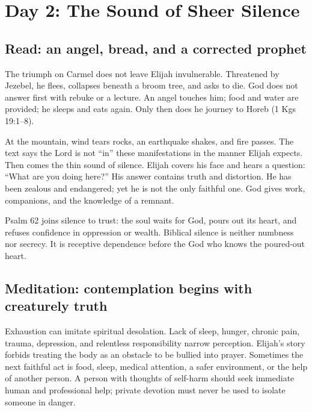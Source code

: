 \section{Day 2: The Sound of Sheer Silence}


\subsection{Read: an angel, bread, and a corrected prophet}

The triumph on Carmel does not leave Elijah invulnerable. Threatened by Jezebel, he flees, collapses beneath a broom tree, and asks to die. God does not answer first with rebuke or a lecture. An angel touches him; food and water are provided; he sleeps and eats again. Only then does he journey to Horeb (1 Kgs 19:1--8).

At the mountain, wind tears rocks, an earthquake shakes, and fire passes. The text says the Lord is not ``in'' these manifestations in the manner Elijah expects. Then comes the thin sound of silence. Elijah covers his face and hears a question: ``What are you doing here?'' His answer contains truth and distortion. He has been zealous and endangered; yet he is not the only faithful one. God gives work, companions, and the knowledge of a remnant.

Psalm 62 joins silence to trust: the soul waits for God, pours out its heart, and refuses confidence in oppression or wealth. Biblical silence is neither numbness nor secrecy. It is receptive dependence before the God who knows the poured-out heart.

\subsection{Meditation: contemplation begins with creaturely truth}

Exhaustion can imitate spiritual desolation. Lack of sleep, hunger, chronic pain, trauma, depression, and relentless responsibility narrow perception. Elijah's story forbids treating the body as an obstacle to be bullied into prayer. Sometimes the next faithful act is food, sleep, medical attention, a safer environment, or the help of another person. A person with thoughts of self-harm should seek immediate human and professional help; private devotion must never be used to isolate someone in danger.

